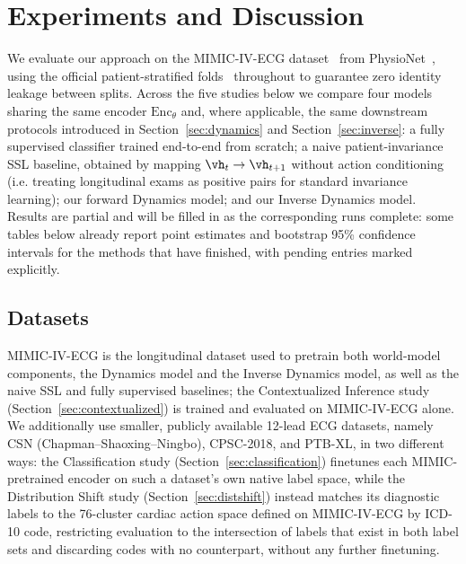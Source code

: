 \section{Experiments and Discussion}

We evaluate our approach on the MIMIC-IV-ECG dataset~\citep{gow2023mimic} from PhysioNet~\citep{goldberger2000physiobank}, using the official patient-stratified folds~\citep{strodthoff2024mimic} throughout to guarantee zero identity leakage between splits. Across the five studies below we compare four models sharing the same encoder $\text{Enc}_\theta$ and, where applicable, the same downstream protocols introduced in Section~\ref{sec:dynamics} and Section~\ref{sec:inverse}: a fully supervised classifier trained end-to-end from scratch; a naive patient-invariance SSL baseline, obtained by mapping $\vh_t \rightarrow \vh_{t+1}$ without action conditioning (i.e. treating longitudinal exams as positive pairs for standard invariance learning); our forward Dynamics model; and our Inverse Dynamics model. Results are partial and will be filled in as the corresponding runs complete: some tables below already report point estimates and bootstrap 95\% confidence intervals for the methods that have finished, with pending entries marked explicitly.

\subsection{Datasets}

MIMIC-IV-ECG is the longitudinal dataset used to pretrain both world-model components, the Dynamics model and the Inverse Dynamics model, as well as the naive SSL and fully supervised baselines; the Contextualized Inference study (Section~\ref{sec:contextualized}) is trained and evaluated on MIMIC-IV-ECG alone. We additionally use smaller, publicly available 12-lead ECG datasets, namely CSN (Chapman--Shaoxing--Ningbo), CPSC-2018, and PTB-XL, %
in two different ways: the Classification study (Section~\ref{sec:classification}) finetunes each MIMIC-pretrained encoder on such a dataset's own native label space, while the Distribution Shift study (Section~\ref{sec:distshift}) instead matches its diagnostic labels to the 76-cluster cardiac action space defined on MIMIC-IV-ECG by ICD-10 code, restricting evaluation to the intersection of labels that exist in both label sets and discarding codes with no counterpart, without any further finetuning.

